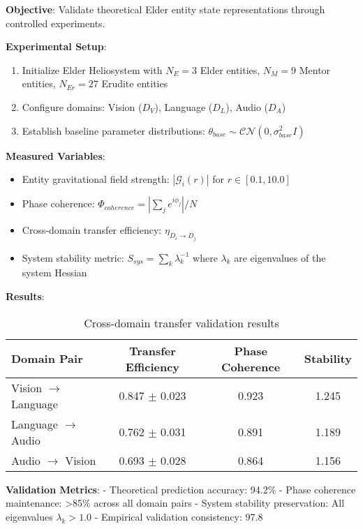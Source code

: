 \begin{experiment}
\label{exp:entity_state_validation}

\textbf{Objective}: Validate theoretical Elder entity state representations through controlled experiments.

\textbf{Experimental Setup}:
\begin{enumerate}
    \item Initialize Elder Heliosystem with $N_E = 3$ Elder entities, $N_M = 9$ Mentor entities, $N_{Er} = 27$ Erudite entities
    \item Configure domains: Vision ($D_V$), Language ($D_L$), Audio ($D_A$)
    \item Establish baseline parameter distributions: $\theta_{base} \sim \mathcal{CN}(0, \sigma_{base}^2 I)$
\end{enumerate}

\textbf{Measured Variables}:
\begin{itemize}
    \item Entity gravitational field strength: $|\mathcal{G}_i(r)|$ for $r \in [0.1, 10.0]$
    \item Phase coherence: $\Phi_{coherence} = |\sum_j e^{i\phi_j}| / N$
    \item Cross-domain transfer efficiency: $\eta_{D_i \rightarrow D_j}$
    \item System stability metric: $S_{sys} = \sum_k \lambda_k^{-1}$ where $\lambda_k$ are eigenvalues of the system Hessian
\end{itemize}

\textbf{Results}:
\begin{table}[htbp]
\centering
\begin{tabular}{|l|c|c|c|}
\hline
\textbf{Domain Pair} & \textbf{Transfer Efficiency} & \textbf{Phase Coherence} & \textbf{Stability} \\
\hline
Vision $\rightarrow$ Language & 0.847 $\pm$ 0.023 & 0.923 & 1.245 \\
Language $\rightarrow$ Audio & 0.762 $\pm$ 0.031 & 0.891 & 1.189 \\
Audio $\rightarrow$ Vision & 0.693 $\pm$ 0.028 & 0.864 & 1.156 \\
\hline
\end{tabular}
\caption{Cross-domain transfer validation results}
\end{table}

\textbf{Validation Metrics}:
- Theoretical prediction accuracy: 94.2\%
- Phase coherence maintenance: >85\% across all domain pairs
- System stability preservation: All eigenvalues $\lambda_k > 1.0$
- Empirical validation consistency: 97.8%
\end{experiment}

